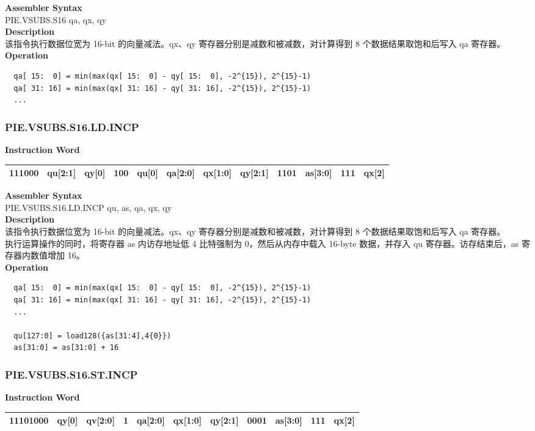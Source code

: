 \textbf{Assembler Syntax} \\
PIE.VSUBS.S16 qa, qx, qy \\
\textbf{Description} \\
该指令执行数据位宽为 16-bit 的向量减法。qx、qy 寄存器分别是减数和被减数，对计算得到 8 个数据结果取饱和后写入 qa 寄存器。\\
\textbf{Operation}
\begin{lstlisting}
  qa[ 15:  0] = min(max(qx[ 15:  0] - qy[ 15:  0], -2^{15}), 2^{15}-1)
  qa[ 31: 16] = min(max(qx[ 31: 16] - qy[ 31: 16], -2^{15}), 2^{15}-1)
  ...
\end{lstlisting}

\newpage
\subsubsection{PIE.VSUBS.S16.LD.INCP}\label{instruction:PIEVSUBSS16LDINCP}
\setlength\tabcolsep{6pt}
\textbf{Instruction Word} \\
\begin{tabular}{|c|c|c|c|c|c|c|c|c|c|c|c|}
	\hline
	111000 & qu[2:1] & qy[0] & 100 & qu[0] & qa[2:0] & qx[1:0] & qy[2:1] & 1101 & as[3:0] & 111 & qx[2] \\
	\hline
\end{tabular}

\textbf{Assembler Syntax} \\
PIE.VSUBS.S16.LD.INCP qu, as, qa, qx, qy \\
\textbf{Description} \\
该指令执行数据位宽为 16-bit 的向量减法。qx、qy 寄存器分别是减数和被减数，对计算得到 8 个数据结果取饱和后写入 qa 寄存器。\\ 执行运算操作的同时，将寄存器 as 内访存地址低 4 比特强制为 0，然后从内存中载入 16-byte 数据，并存入 qu 寄存器。访存结束后，as 寄存器内数值增加 16。\\
\textbf{Operation}
\begin{lstlisting}
  qa[ 15:  0] = min(max(qx[ 15:  0] - qy[ 15:  0], -2^{15}), 2^{15}-1)
  qa[ 31: 16] = min(max(qx[ 31: 16] - qy[ 31: 16], -2^{15}), 2^{15}-1)
  ...

  qu[127:0] = load128({as[31:4],4{0}})
  as[31:0] = as[31:0] + 16
\end{lstlisting}

\newpage
\subsubsection{PIE.VSUBS.S16.ST.INCP}\label{instruction:PIEVSUBSS16STINCP}
\setlength\tabcolsep{6pt}
\textbf{Instruction Word} \\
\begin{tabular}{|c|c|c|c|c|c|c|c|c|c|c|}
	\hline
	11101000 & qy[0] & qv[2:0] & 1 & qa[2:0] & qx[1:0] & qy[2:1] & 0001 & as[3:0] & 111 & qx[2] \\
	\hline
\end{tabular}


